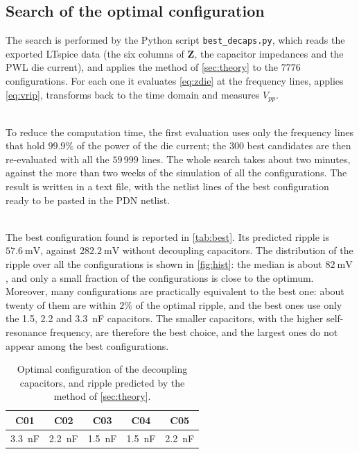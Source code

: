 
\subsection{Search of the optimal configuration}

The search is performed by the Python script \texttt{best\_decaps.py}, which reads the exported LTspice data (the six columns of $\mathbf{Z}$, the capacitor
impedances and the PWL die current), and applies the method of \autoref{sec:theory} to the $7776$ configurations. For each one it evaluates \eqref{eq:zdie} at
the frequency lines, applies \eqref{eq:vrip}, transforms back to the time domain and measures $V_{pp}$.

\noindent\\ To reduce the computation time, the first evaluation
uses only the frequency lines that hold $99.9\%$ of the power of the die current; the $300$ best candidates are then re-evaluated with all the
$59\,999$ lines. The whole search takes about two minutes, against the more than two weeks of the simulation of all the configurations. The result is written in a text file,
with the netlist lines of the best configuration ready to be pasted in the PDN netlist.

\noindent\\ The best configuration found is reported in \autoref{tab:best}. Its predicted ripple is $57.6~\text{mV}$, against $282.2~\text{mV}$ without decoupling capacitors. The
distribution of the ripple over all the configurations is shown in \autoref{fig:hist}: the median is about $82~\text{mV}$, and only a small fraction of the
configurations is close to the optimum. Moreover, many configurations are practically equivalent to the best one: about twenty of them are within $2\%$ of the optimal ripple, and the best ones
use only the 1.5, 2.2 and 3.3~nF capacitors. The smaller capacitors, with the higher self-resonance frequency, are therefore the best choice, and the largest
ones do not appear among the best configurations.

\begin{table}[!h]
\centering
\caption{Optimal configuration of the decoupling capacitors, and ripple predicted by the method of \autoref{sec:theory}.}
\label{tab:best}
\begin{tabular}{ccccc}
\hline
\textbf{C01} & \textbf{C02} & \textbf{C03} & \textbf{C04} & \textbf{C05} \\
\hline
3.3~nF & 2.2~nF & 1.5~nF & 1.5~nF & 2.2~nF \\
\hline
\end{tabular}
\end{table}

